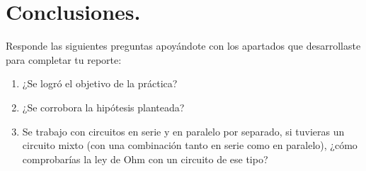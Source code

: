 \documentclass[14pt]{extarticle}
\begin{document}
\section{Conclusiones.}

Responde las siguientes preguntas apoyándote con los apartados que desarrollaste para completar tu reporte:
\begin{enumerate}
\item ¿Se logró el objetivo de la práctica?
\item ¿Se corrobora la hipótesis planteada?
\item Se trabajo con circuitos en serie y en paralelo por separado, si tuvieras un circuito mixto (con una combinación tanto en serie como en paralelo), ¿cómo comprobarías la ley de Ohm con un circuito de ese tipo?
\end{enumerate}
\end{document}
